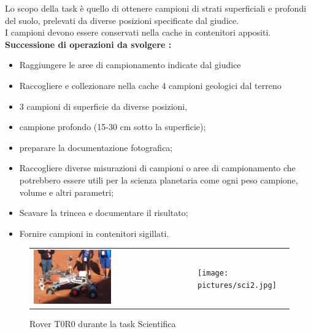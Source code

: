 \documentclass[%
corpo=11pt,
twoside,
 stile=classica,
oldstyle,
greek,%
]{toptesi}
\begin{document}
		Lo scopo della task è quello di ottenere campioni di strati superficiali e profondi del suolo, prelevati da diverse posizioni specificate dal giudice. \\
		I campioni devono essere conservati nella cache in contenitori appositi.
		\newline
		\textbf{Successione di operazioni da svolgere :} 
		\begin{itemize}
			\item Raggiungere  le aree di campionamento indicate dal giudice 
			\item Raccogliere e collezionare nella cache 4 campioni geologici dal terreno
			\item 3 campioni di superficie da diverse posizioni,
			\item campione profondo (15-30 cm sotto la superficie);
			\item preparare la documentazione fotografica;
			\item Raccogliere diverse misurazioni di campioni o aree di campionamento che potrebbero essere utili
			per la scienza planetaria come ogni peso campione, volume e altri parametri;
			\item Scavare la trincea e documentare il risultato;
			\item Fornire campioni in contenitori sigillati.
		\end{itemize}
		\begin{figure}
			\centering
			\begin{tabular}{ll}
				\includegraphics[width=0.5\textwidth]{pictures/sci1.jpg}
				&
				\texttt{[image: pictures/sci2.jpg]}
			\end{tabular}
			\caption{Rover T0R0 durante la task Scientifica}
			\label{fig:science}
		\end{figure}
\end{document}
